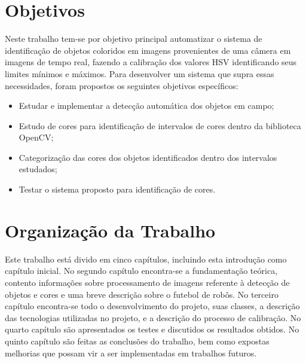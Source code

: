 \section{Objetivos}
Neste trabalho tem-se por objetivo principal automatizar o sistema de identificação de objetos 
coloridos em imagens provenientes de uma câmera em imagens de tempo real, fazendo a calibração dos valores HSV identificando seus limites mínimos e máximos.  
Para desenvolver um sistema que supra essas necessidades, foram propostos os seguintes objetivos específicos:

\begin{itemize}
	
	\item Estudar e implementar a detecção automática dos objetos em campo; 
	\item Estudo de cores para identificação de intervalos de cores dentro da biblioteca OpenCV;
	\item Categorização das cores dos objetos identificados dentro dos intervalos estudados;
	\item Testar o sistema proposto para identificação de cores.
	
	
\end{itemize}

\newpage

\section{Organização da Trabalho} \label{Sec:Organizacao}

Este trabalho está divido em cinco capítulos, incluindo esta introdução como capítulo inicial. No segundo capítulo encontra-se a fundamentação teórica, contento informaç\~oes sobre processamento de imagens referente à detecção de objetos e cores e uma breve descrição sobre o futebol de robôs. No terceiro capítulo encontra-se todo o desenvolvimento do projeto, suas classes, a descrição das tecnologias utilizadas no projeto, e a descrição do processo de calibração. No quarto capítulo são apresentados os testes e discutidos os resultados obtidos. No quinto capítulo são feitas as conclusões do trabalho, bem como expostas melhorias que possam vir a ser implementadas em trabalhos futuros.
